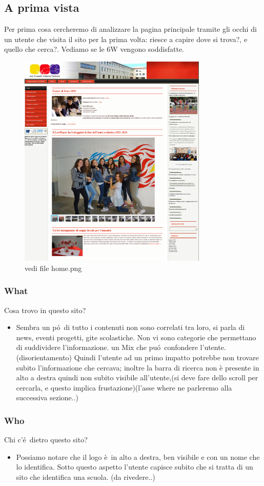 \documentclass[12pt]{article}
\begin{document}
\subsection{A prima vista}
Per prima cosa cercheremo di analizzare la pagina principale tramite gli occhi di un utente che visita il sito per la prima volta: riesce a capire dove si trova?, e quello che cerca?. Vediamo se le 6W vengono soddisfatte.

\begin{figure}[ht!]
\centering
\includegraphics[width=90mm]{home}
\caption{vedi file home.png}
\end{figure} 


\subsubsection{What} Cosa trovo in questo sito?
\begin{itemize}
	\item Sembra un p\'o\ di tutto i contenuti non sono correlati tra loro, si parla di news, eventi progetti, gite scolastiche. Non vi sono categorie che permettano di suddividere l'informazione. un Mix che pu\'o\ confondere l'utente.(disorientamento) Quindi l'utente ad un primo impatto potrebbe non trovare subito l'informazione che cercava; inoltre la barra di ricerca non è presente in alto a destra quindi non subito visibile all'utente,(si deve fare dello scroll per cercarla, e questo implica frustazione)(l'asse where ne parleremo alla successiva sezione..)
\end{itemize}
\subsubsection{Who} Chi c'\'e\ dietro questo sito?
\begin{itemize}
	\item Possiamo notare che il logo \`e\ in alto a destra, ben visibile e con un nome che lo identifica. Sotto questo aspetto l'utente capisce subito che si tratta di  un sito che identifica una scuola. (da rivedere..)
\end{itemize}
\end{document}
